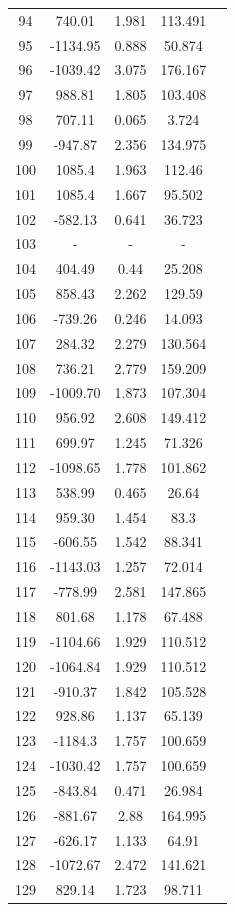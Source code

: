 {\begin{longtable}{ccccc}
94 & 740.01 & 1.981 & 113.491 \\
95 & -1134.95 & 0.888 & 50.874 \\
96 & -1039.42 & 3.075 & 176.167 \\
97 & 988.81 & 1.805 & 103.408 \\
98 & 707.11 & 0.065 & 3.724 \\
99 & -947.87 & 2.356 & 134.975 \\
100 & 1085.4 & 1.963 & 112.46 \\
101 & 1085.4 & 1.667 & 95.502 \\
102 & -582.13 & 0.641 & 36.723 \\
103 & - & - & - \\
104 & 404.49 & 0.44 & 25.208 \\
105 & 858.43 & 2.262 & 129.59 \\
106 & -739.26 & 0.246 & 14.093 \\
107 & 284.32 & 2.279 & 130.564 \\
108 & 736.21 & 2.779 & 159.209 \\
109 & -1009.70 & 1.873 & 107.304 \\
110 & 956.92 & 2.608 & 149.412 \\
111 & 699.97 & 1.245 & 71.326 \\
112 & -1098.65 & 1.778 & 101.862 \\
113 & 538.99 & 0.465 & 26.64 \\
114 & 959.30 & 1.454 & 83.3 \\
115 & -606.55 & 1.542 & 88.341 \\
116 & -1143.03 & 1.257 & 72.014 \\
117 & -778.99 & 2.581 & 147.865 \\
118 & 801.68 & 1.178 & 67.488 \\
119 & -1104.66 & 1.929 & 110.512 \\
120 & -1064.84 & 1.929 & 110.512 \\
121 & -910.37 & 1.842 & 105.528 \\
122 & 928.86 & 1.137 & 65.139 \\
123 & -1184.3 & 1.757 & 100.659 \\
124 & -1030.42 & 1.757 & 100.659 \\
125 & -843.84 & 0.471 & 26.984 \\
126 & -881.67 & 2.88 & 164.995 \\
127 & -626.17 & 1.133 & 64.91 \\
128 & -1072.67 & 2.472 & 141.621 \\
129 & 829.14 & 1.723 & 98.711 \\

\end{longtable}}
